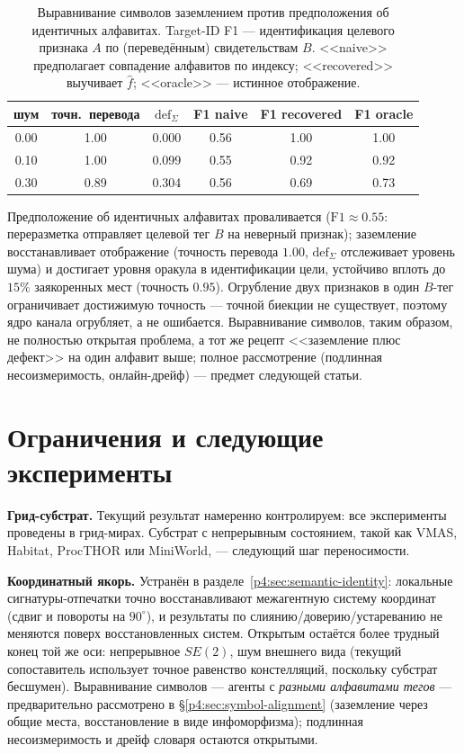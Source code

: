 \documentclass{article}
\begin{document}
\begin{table}[h]
\caption{Выравнивание символов заземлением против предположения об идентичных
алфавитах. Target-ID F1 --- идентификация целевого признака $A$ по
(переведённым) свидетельствам $B$. <<naive>> предполагает совпадение алфавитов
по индексу; <<recovered>> выучивает $\hat f$; <<oracle>> --- истинное
отображение.}
\label{p4:tab:symbol-alignment}
\centering
\small
\begin{tabular}{c c c c c c}
\toprule
шум & точн.\ перевода & $\mathrm{def}_\Sigma$ & F1 naive & F1 recovered & F1 oracle \\
\midrule
0.00 & 1.00 & 0.000 & 0.56 & 1.00 & 1.00 \\
0.10 & 1.00 & 0.099 & 0.55 & 0.92 & 0.92 \\
0.30 & 0.89 & 0.304 & 0.56 & 0.69 & 0.73 \\
\bottomrule
\end{tabular}
\end{table}

Предположение об идентичных алфавитах проваливается
($\text{F1}\approx0.55$: переразметка отправляет целевой тег $B$ на неверный
признак); заземление восстанавливает отображение (точность перевода $1.00$,
$\mathrm{def}_\Sigma$ отслеживает уровень шума) и достигает уровня оракула в
идентификации цели, устойчиво вплоть до $15\%$ заякоренных мест (точность
$0.95$). Огрубление двух признаков в один $B$-тег ограничивает достижимую
точность --- точной биекции не существует, поэтому ядро канала огрубляет, а
не ошибается. Выравнивание символов, таким образом, не полностью открытая
проблема, а тот же рецепт <<заземление плюс дефект>> на один алфавит выше;
полное рассмотрение (подлинная несоизмеримость, онлайн-дрейф) --- предмет
следующей статьи.

\section{Ограничения и следующие эксперименты}
\label{p4:sec:limitations}

\textbf{Грид-субстрат.} Текущий результат намеренно контролируем: все
эксперименты проведены в грид-мирах. Субстрат с непрерывным состоянием, такой
как VMAS, Habitat, ProcTHOR или MiniWorld, --- следующий шаг переносимости.

\textbf{Координатный якорь.} Устранён в
разделе~\ref{p4:sec:semantic-identity}: локальные сигнатуры-отпечатки
точно восстанавливают межагентную систему координат (сдвиг и повороты
на $90^\circ$), и результаты по слиянию/доверию/устареванию не
меняются поверх восстановленных систем. Открытым остаётся более
трудный конец той же оси: непрерывное $SE(2)$, шум внешнего вида
(текущий сопоставитель использует точное равенство констелляций,
поскольку субстрат бесшумен). Выравнивание символов --- агенты с
\emph{разными алфавитами тегов} --- предварительно рассмотрено в
\S\ref{p4:sec:symbol-alignment} (заземление через общие места,
восстановление в виде инфоморфизма); подлинная несоизмеримость и дрейф
словаря остаются открытыми.
\end{document}
